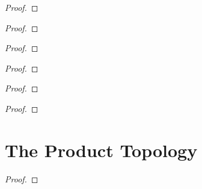 \begin{proof}
\end{proof}


\begin{exercise}\label{chapter2:section18:exercise9}
\end{exercise}

\begin{proof}
\end{proof}


\begin{exercise}\label{chapter2:section18:exercise10}
\end{exercise}

\begin{proof}
\end{proof}


\begin{exercise}\label{chapter2:section18:exercise11}
\end{exercise}

\begin{proof}
\end{proof}


\begin{exercise}\label{chapter2:section18:exercise12}
\end{exercise}

\begin{proof}
\end{proof}


\begin{exercise}\label{chapter2:section18:exercise13}
\end{exercise}

\begin{proof}
\end{proof}


\section{The Product Topology}

\begin{exercise}\label{chapter2:section19:exercise1}
\end{exercise}

\begin{proof}
\end{proof}


\begin{exercise}\label{chapter2:section19:exercise2}
\end{exercise}

